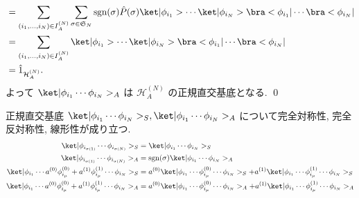 \documentclass[uplatex,dvipdfmx,a4paper,11pt]{jlreq}
\makeatletter
\DeclareMathOperator{\sgn}{sgn}
\newcommand{\HH}{\mathcal{H}}
\renewcommand{\SS}{\mathfrak{S}}
\numberwithin{equation}{section}
\theoremstyle{definition}
\renewenvironment{proof}[1][\proofname]{\par
  \normalfont
  \topsep6\p@\@plus6\p@ \trivlist
  \item[\hskip\labelsep{\bfseries #1}\@addpunct{\bfseries}]\ignorespaces\quad\par
}{%
  \qed\endtrivlist\@endpefalse
}
\renewcommand\proofname{証明}
\makeatother
\begin{document}
\begin{proof}
\begin{align}
     & = \sum_{(i_1,\ldots,i_N)\in I_A^{(N)}}\sum_{\sigma\in\SS_N}\sgn(\sigma)\hat{P}(\sigma)\ket|\phi_{i_1}>\cdots\ket|\phi_{i_N}>\bra<\phi_{i_1}|\cdots\bra<\phi_{i_N}|                                                         \\
     & = \sum_{(i_1,\ldots,i_N)\in I_A^{(N)}}\ket|\phi_{i_1}>\cdots\ket|\phi_{i_N}>\bra<\phi_{i_1}|\cdots\bra<\phi_{i_N}|                                                                                                         \\
     & = \hat{1}_{\HH_A^{(N)}}.
  \end{align}
  よって $\ket|\phi_{i_1}\cdots\phi_{i_N}>_A$ は $\HH_A^{(N)}$ の正規直交基底となる.
\end{proof}

\begin{proposition}
  正規直交基底 $\ket|\phi_{i_1}\cdots\phi_{i_N}>_S, \ket|\phi_{i_1}\cdots\phi_{i_N}>_A$ について完全対称性, 完全反対称性, 線形性が成り立つ.
  \begin{align}
    \ket|\phi_{i_{\sigma(1)}}\cdots\phi_{i_{\sigma(N)}}>_S                                         & = \ket|\phi_{i_1}\cdots\phi_{i_N}>_S                                                                                                    \\
    \ket|\phi_{i_{\sigma(1)}}\cdots\phi_{i_{\sigma(N)}}>_A                                         & = \sgn(\sigma)\ket|\phi_{i_1}\cdots\phi_{i_N}>_A                                                                                        \\
    \ket|\phi_{i_1}\cdots a^{(0)}\phi_{i_\mu}^{(0)} + a^{(1)}\phi_{i_\mu}^{(1)}\cdots\phi_{i_N}>_S & = a^{(0)}\ket|\phi_{i_1}\cdots\phi_{i_\mu}^{(0)}\cdots\phi_{i_N}>_S + a^{(1)}\ket|\phi_{i_1}\cdots\phi_{i_\mu}^{(1)}\cdots\phi_{i_N}>_S \\
    \ket|\phi_{i_1}\cdots a^{(0)}\phi_{i_\mu}^{(0)} + a^{(1)}\phi_{i_\mu}^{(1)}\cdots\phi_{i_N}>_A & = a^{(0)}\ket|\phi_{i_1}\cdots\phi_{i_\mu}^{(0)}\cdots\phi_{i_N}>_A + a^{(1)}\ket|\phi_{i_1}\cdots\phi_{i_\mu}^{(1)}\cdots\phi_{i_N}>_A
  \end{align}
\end{proposition}
\end{document}
